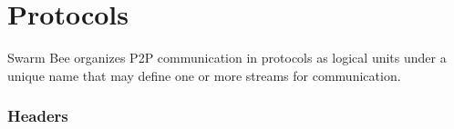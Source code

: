 





\section{Protocols \statusgreen}\label{sec:protocols}

Swarm Bee organizes P2P communication in protocols as logical units
under a unique name that may define one or more streams for
communication.

\subsubsection{Headers}\label{headers}

